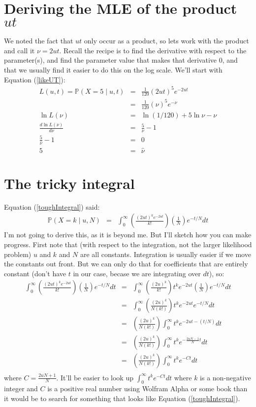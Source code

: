 \documentclass[11pt]{article}
\renewcommand{\Pr}{\mathbb{P}}
\begin{document}
\appendix
\section{Deriving the MLE of the product $ut$}\label{appUT}
We noted the fact that $ut$ only occur as a product, so
lets work with the product and call it $\nu=2ut$.
Recall the recipe is to find the derivative with respect to the parameter(s),
and find the parameter value that makes that derivative 0, and 
that we usually find it easier to do this on the log scale.
We'll start with Equation (\ref{likeUT}):
\begin{eqnarray*}
L(u, t) = \Pr(X=5 \mid u, t) & = &\frac{1}{120}(2ut)^5 e^{-2ut} \\
& = &\frac{1}{120}(\nu)^5 e^{-\nu} \\
\ln L(\nu) & = & \ln{(1/120)} + 5\ln\nu - \nu\\
\frac{d \ln L(\nu)}{d \nu} & = & \frac{5}{\nu} - 1 \\
\frac{5}{\hat{\nu}} - 1 & = & 0 \\
5 & = & \hat{\nu} 
\end{eqnarray*}

\section{The tricky integral}
\label{deriveTheta}
Equation (\ref{toughIntegral}) said:
\begin{eqnarray*}\Pr(X=k \mid u, N) & = & \int_{0}^{\infty} \left(\frac{(2ut)^k e^{-2ut}}{k!} \right)\left(\frac{1}{N}\right) e^{-t/N}dt
\end{eqnarray*}
I'm not going to derive this, as it is beyond me.
But I'll sketch how you can make progress.
First note that (with respect to the integration, not the larger likelihood problem)
$u$ and $k$ and $N$ are all constants.
Integration is usually easier if we move the constants out front.
But we can only do that for coefficients that are entirely constant (don't have $t$ 
in our case, becase we are integrating over $dt$), so:
\begin{eqnarray*}
\int_{0}^{\infty} \left(\frac{(2ut)^k e^{-2ut}}{k!} \right)\left(\frac{1}{N}\right) e^{-t/N}dt 
& = & \int_{0}^{\infty} \left(\frac{(2u)^k}{k!}\right) t^ke^{-2ut} \left(\frac{1}{N}\right) e^{-t/N} dt \\
& = & \int_{0}^{\infty} \left(\frac{(2u)^k}{N(k!)}\right) t^ke^{-2ut} e^{-t/N} dt \\
& = & \left(\frac{(2u)^k}{N(k!)}\right) \int_{0}^{\infty}  t^ke^{-2ut - (t/N)} dt \\
& = & \left(\frac{(2u)^k}{N(k!)}\right) \int_{0}^{\infty}  t^ke^{-\frac{2uN - 1}{N} t} dt \\
& = & \left(\frac{(2u)^k}{N(k!)}\right) \int_{0}^{\infty}  t^ke^{-C t} dt \\
\end{eqnarray*}
where $C=\frac{2uN + 1}{N}$.
It'll be easier to look up $ \int_{0}^{\infty}  t^ke^{-C t} dt$ where $k$ is a non-negative
integer and $C$ is a positive real number using Wolfram Alpha or some book than it would be
to search for something that looks like Equation (\ref{toughIntegral}).
\end{document}
